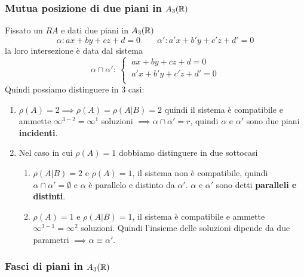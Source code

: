 \subsubsection{Mutua posizione di due piani in \(A_3(\RR )\)}
Fissato un \(RA\) e dati due piani in \(A_3(\RR )\)\[
\alpha : ax + by + cz + d = 0 \qquad \alpha' : a'x + b'y + c'z + d' = 0
\] la loro intersezione è data dal sistema \[
\alpha \cap \alpha' : \
\begin{cases}
    \ ax + by + cz + d = 0 \\
    \ a'x + b'y + c'z + d' = 0 \\
\end{cases}
\] Quindi possiamo distinguere in 3 casi:
\begin{enumerate}
    \item \(\rho(A) = 2 \implies \rho(A) = \rho(A|B) = 2 \) quindi il sistema è compatibile e ammette \(\infty^{3-2} = \infty^{1}\) soluzioni \(\implies \alpha \cap \alpha' = r\), quindi \(\alpha \) e \(\alpha'\) sono due piani \textbf{incidenti}.
    \item Nel caso in cui \(\rho(A) = 1\) dobbiamo distinguere in due sottocasi
        \begin{enumerate}
            \item \(\rho(A|B) = 2 \) e \(\rho(A) = 1\), il sistema non è compatibile, quindi \(\alpha \cap \alpha' = \emptyset\) e \(\alpha \) è parallelo e distinto da \(\alpha'\). \(\alpha \) e \(\alpha'\) sono detti \textbf{paralleli e distinti}.
            \item \(\rho(A) = 1\) e \(\rho(A|B) = 1\), il sistema è compatibile e ammette \(\infty^{3-1} = \infty^{2}\) soluzioni. Quindi l'insieme delle soluzioni dipende da due parametri \(\implies \alpha \equiv \alpha'\).
        \end{enumerate}
\end{enumerate}


\subsubsection{Fasci di piani in \(A_3(\RR )\)}

